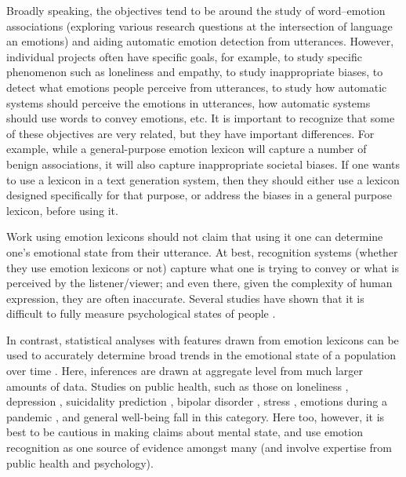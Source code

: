 \documentclass[11pt]{article}
\begin{document}
Broadly speaking, the objectives tend to be around the study of word--emotion associations (exploring various research questions at the intersection of language an emotions) and aiding automatic emotion detection from utterances. However, %
individual
projects often have specific goals, for example, 
to study specific phenomenon such as loneliness and empathy, to study inappropriate biases, to detect what emotions people perceive from utterances, 
to study how automatic systems should perceive the emotions in utterances, 
how automatic systems should use words to convey emotions, etc. It is important to recognize that some of these objectives are very related, but they have important differences. For example, while a general-purpose emotion lexicon will capture a number of benign associations, it will also capture inappropriate societal biases. If one wants to use a lexicon in a text generation system, then they should either use a lexicon designed specifically for that purpose, or address the biases in a general purpose lexicon, before using it.

Work using emotion lexicons should not claim that using it one can determine one's emotional state from their utterance. At best, recognition systems (whether they use emotion lexicons or not) capture what one is trying to convey or what is perceived by the listener/viewer; and even there, given the complexity of human expression, they are often inaccurate.
Several studies have shown that it is difficult to fully measure psychological states of people \cite{stark2018algorithmic,barrett2017theory}.

In contrast, statistical analyses with features drawn from emotion lexicons can be used to accurately determine broad trends in the emotional state of a population over time \cite{TMemotionarcs}. Here, inferences are drawn at aggregate level from much larger amounts of data. 
Studies on public health, such as those on loneliness \cite{guntuku2019studying,kiritchenko-etal-2020-solo}, depression \cite{de2013predicting,resnik-etal-2015-beyond}, suicidality prediction \cite{macavaney-etal-2021-community}, bipolar disorder \cite{karam2014ecologically}, stress \cite{eichstaedt2015psychological}, 
emotions during a pandemic \cite{VM2022-TED},
and general well-being \cite{rtz2013cschwaharacterizing} fall in this category. Here too, however, it is best to be cautious in making claims about mental state, and use emotion recognition as one source of evidence amongst many (and involve expertise from public health and psychology). %
\end{document}
